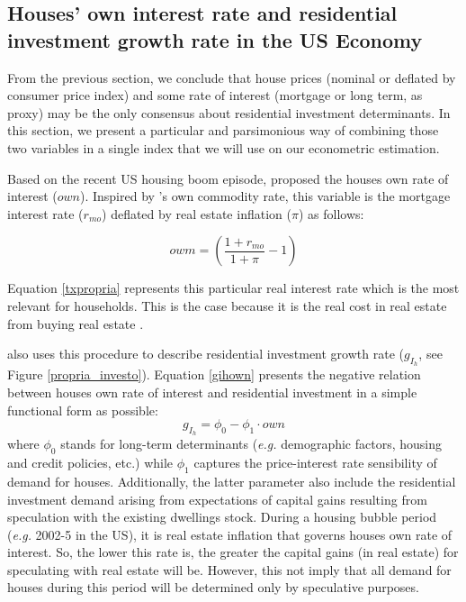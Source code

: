 \documentclass[12pt, a4paper]{article}
\begin{document}
\subsection{Houses' own interest rate and residential investment growth rate in the US Economy}
\label{sec:org33e47f9}
\label{sc:own}

From the previous section, we conclude that house prices (nominal or deflated by consumer price index) and some rate of interest (mortgage or long term, as proxy) may be the only consensus about residential investment determinants.
In this section, we present a particular and parsimonious way of combining those two variables  in a single index that we will use on our econometric estimation.

Based on the recent US housing boom episode, \textcite{teixeira_crescimento_2015}  proposed the houses own rate of interest (\(own\)).
Inspired by \citeauthor*{sraffaDrHayekMoney1932}'s \citeyear{sraffaDrHayekMoney1932} own commodity rate, this variable is the mortgage interest rate (\(r_{mo}\)) deflated by real estate inflation (\(\pi\)) as follows:
\begin{latex}
\begin{equation}
\label{txpropria}
owm =  \left(\frac{1+r_{mo}}{1+\pi} - 1\right)
\end{equation}
\end{latex}
Equation \ref{txpropria} represents this particular real interest rate which is the most relevant for households.
This is the case because it is the real cost in real estate from buying real estate  \cite[p.~53]{teixeira_crescimento_2015}.

\textcite{teixeira_crescimento_2015} also uses this procedure to describe residential investment growth rate (\(g_{I_{h}}\), see Figure \ref{propria_investo}).
Equation \ref{gihown} presents the negative relation between houses own rate of interest and residential investment in a simple functional form as possible:
\begin{equation}
\label{gihown}
g_{I_h} = \phi_0 - \phi_1\cdot own
\end{equation}
where \(\phi_0\) stands for long-term determinants (\emph{e.g.} demographic factors, housing and credit policies, etc.) while \(\phi_1\) captures the price-interest rate sensibility of demand for houses.
Additionally, the latter parameter also include the residential investment demand arising from expectations of capital gains resulting from speculation with the existing dwellings stock.
During a housing bubble period (\emph{e.g.} 2002-5 in the US), it is real estate inflation that governs houses own rate of interest.
So, the lower this rate is, the greater the capital gains (in real estate) for speculating with real estate will be.
However, this not imply that all demand for houses during this period will be determined only by speculative purposes.
\end{document}
